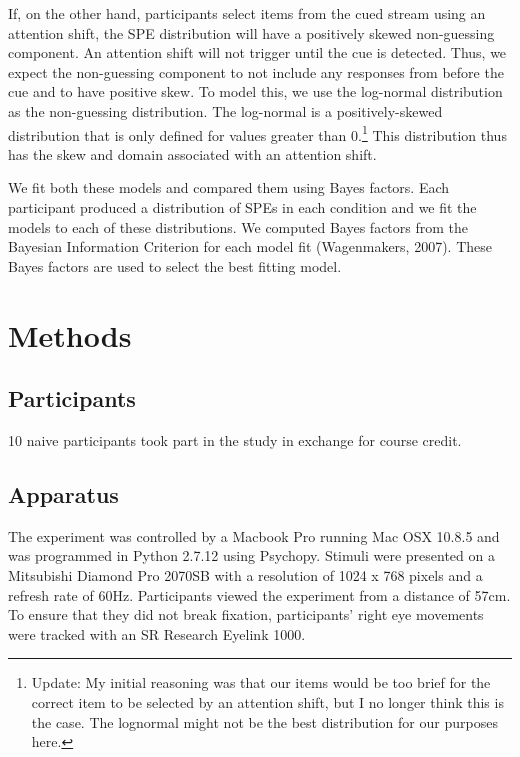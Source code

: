\documentclass[,man]{apa6}
\let\rmarkdownfootnote\footnote%
\def\footnote{\protect\rmarkdownfootnote}
\theoremstyle{definition}
\theoremstyle{definition}
\theoremstyle{definition}
\theoremstyle{remark}
\begin{document}
If, on the other hand, participants select items from the cued stream
using an attention shift, the SPE distribution will have a positively
skewed non-guessing component. An attention shift will not trigger until
the cue is detected. Thus, we expect the non-guessing component to not
include any responses from before the cue and to have positive skew. To
model this, we use the log-normal distribution as the non-guessing
distribution. The log-normal is a positively-skewed distribution that is
only defined for values greater than 0.\footnote{Update: My initial
  reasoning was that our items would be too brief for the correct item
  to be selected by an attention shift, but I no longer think this is
  the case. The lognormal might not be the best distribution for our
  purposes here.} This distribution thus has the skew and domain
associated with an attention shift.

We fit both these models and compared them using Bayes factors. Each
participant produced a distribution of SPEs in each condition and we fit
the models to each of these distributions. We computed Bayes factors
from the Bayesian Information Criterion for each model fit (Wagenmakers,
2007). These Bayes factors are used to select the best fitting model.

\section{Methods}\label{methods}

\subsection{Participants}\label{participants}

10 naive participants took part in the study in exchange for course
credit.

\subsection{Apparatus}\label{apparatus}

The experiment was controlled by a Macbook Pro running Mac OSX 10.8.5
and was programmed in Python 2.7.12 using Psychopy. Stimuli were
presented on a Mitsubishi Diamond Pro 2070SB with a resolution of 1024 x
768 pixels and a refresh rate of 60Hz. Participants viewed the
experiment from a distance of 57cm. To ensure that they did not break
fixation, participants' right eye movements were tracked with an SR
Research Eyelink 1000.
\end{document}
